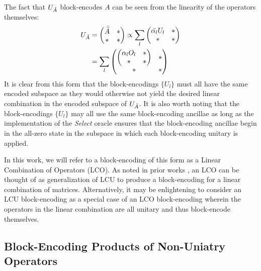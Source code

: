 The fact that $U_{\Tilde{A}}$ block-encodes $A$ can be seen from the linearity of the operators themselves:
\begin{equation}
    \begin{split}
        U_{\Tilde{A}} &= 
        \begin{pmatrix}
        \bar{\Tilde{A}} & * \\
        * & * 
        \end{pmatrix} \propto
        \sum_{l}
        \begin{pmatrix}
        \Tilde{\alpha_l} U_l & * \\
        * & * 
        \end{pmatrix} \\
        & =\sum_{l}
        \begin{pmatrix}
        \begin{pmatrix}
            \alpha_l O_l & * \\
            * & * 
        \end{pmatrix} & * \\
        * & * 
        \end{pmatrix} 
    \end{split}
\end{equation}
It is clear from this form that the block-encodings $\{U_l\}$ must all have the same encoded subspace as they would otherwise not yield the desired linear combination in the encoded subspace of $U_{\Tilde{A}}$.
It is also worth noting that the block-encodings $\{U_l\}$ may all use the same block-encoding ancillae as long as the implementation of the \textit{Select} oracle ensures that the block-encoding ancillae begin in the all-zero state in the subspace in which each block-encoding unitary is applied.

In this work, we will refer to a block-encoding of this form as a Linear Combination of Operators (LCO).
As noted in prior works \cite{berry2015simulating, childs2017quantum, gilyen2019quantum, lin2022lecture, jennings2023efficient}, an LCO can be thought of as generalization of LCU to produce a block-encoding for a linear combination of matrices.
Alternatively, it may be enlightening to consider an LCU block-encoding as a special case of an LCO block-encoding wherein the operators in the linear combination are all unitary and thus block-encode themselves.

\subsection{Block-Encoding Products of Non-Uniatry Operators}
\label{subsec:be-products}

